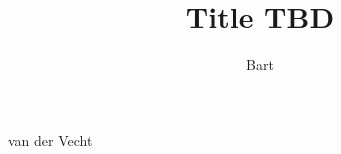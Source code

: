 \documentclass{propositions}
\begin{document}
\title{
    Title TBD
}
\author{Bart}{van der Vecht}



\clearpage
{

}
\end{document}
